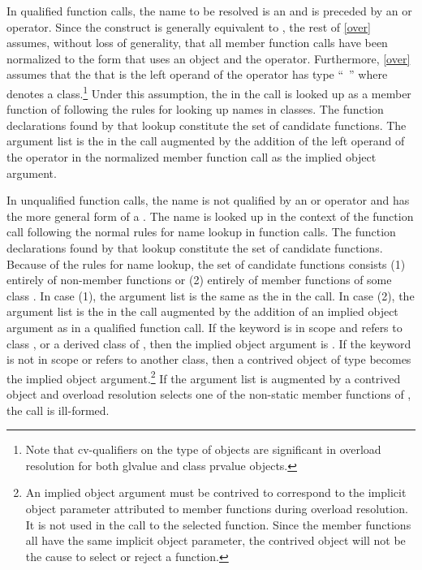 \pnum
In qualified function calls, the name to be resolved is an
and is preceded by an
\tcode{->}
or
operator.
Since the
construct
is generally equivalent to
,
the rest of
\ref{over} assumes, without loss of generality, that all member
function calls have been normalized to the form that uses an
object and the
operator.
Furthermore, \ref{over} assumes that
the
that is the left operand of the
operator
has type ``\cv{}~''
where
denotes a class.\footnote{Note that cv-qualifiers on the type of objects are
significant in overload
resolution for
both glvalue and class prvalue objects.}
Under this
assumption, the
in the call is looked up as a
member function of
following the rules for looking up names in
classes.
The function declarations found by that lookup constitute the set of
candidate functions.
The argument list is the
in the call augmented by the addition of the left operand of
the
operator in the normalized member function call as the
implied object argument.

\pnum
In unqualified function calls, the name is not qualified by an
\tcode{->}
or
operator and has the more general form of a
.
The name is looked up in the context of the function
call following the normal rules for name lookup in function
calls.
The function declarations found by that lookup constitute the
set of candidate functions.
Because of the rules for name lookup, the set of candidate functions
consists (1) entirely of non-member functions or (2) entirely of
member functions of some class
.
In case (1),
the argument list is
the same as the
in the call.
In case (2), the argument list is the
in the call augmented by the addition of an implied object
argument as in a qualified function call.
If the keyword
 is in scope and refers to
class
,
or a derived class of
,
then the implied object argument is
.
If the keyword
is not in
scope or refers to another class, then
a contrived object of type
becomes the implied object
argument.\footnote{An implied object argument must be contrived to
correspond to the implicit object
parameter attributed to member functions during overload resolution.
It is not
used in
the call to the selected function.
Since the member functions all have the
same implicit
object parameter, the contrived object will not be the cause to select or
reject a
function.}
If the argument list is augmented by a contrived object and overload
resolution selects one of the non-static member functions of
,
the call is ill-formed.

